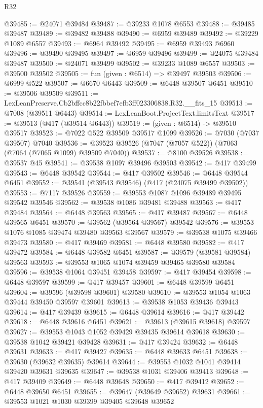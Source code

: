 \begin{lexlean}{R32}
\begin{coremodule}
@39485 := @24071 @39484
@39487 := @39233 @1078 @6553
@39488 := @39485 @39487
@39489 := @39482 @39488
@39490 := @6959 @39489
@39492 := @39229 @1089 @6557
@39493 := @6964 @39492
@39495 := @6959 @39493 @6960
@39496 := @39490 @39495
@39497 := @6959 @39496
@39499 := @24075 @39484 @39487
@39500 := @24071 @39499
@39502 := @39233 @1089 @6557
@39503 := @39500 @39502
@39505 := fun (given : @6514) => @39497 @39503
@39506 := @6999 @522
@39507 := @6670 @6443
@39509 := @6448 @39507 @6451
@39510 := @39506 @39509
@39511 := LexLeanPreserve.Cb2bffcc8b22fbbef7efb3ff023306838.R32.__fits_15
@39513 := @7008 (@39511 @6443)
@39514 := LexLeanBoot.ProjectText.limitsText
@39517 := @39513 (@417 (@39514 @6443))
@39519 := (given : @6514) -> @39510 @39517
@39523 := @7022 @522 @39509 @39517 @1099
@39526 := @7030 (@7037 @39507) @7040
@39536 := @39523 @39526 (@7047 (@7057 @522)) (@7063 (@7064 (@7065 @1099) @39509 @7040))
@39537 := @8100 @39526
@39538 := @39537 @45
@39541 := @39538 @1097 @39496 @39503
@39542 := @417 @39499
@39543 := @6448 @39542
@39544 := @417 @39502
@39546 := @6448 @39544 @6451
@39552 := @39541 (@39543 @39546) (@417 (@24075 @39499 @39502))
@39553 := @7117 @39526
@39559 := @39553 @1087 @1096 @39489 @39495 @39542 @39546
@39562 := @39538 @1086 @39481 @39488
@39563 := @417 @39484
@39564 := @6448 @39563
@39565 := @417 @39487
@39567 := @6448 @39565 @6451
@39570 := @39562 (@39564 @39567) @39542
@39576 := @39553 @1076 @1085 @39474 @39480 @39563 @39567
@39579 := @39538 @1075 @39466 @39473
@39580 := @417 @39469
@39581 := @6448 @39580
@39582 := @417 @39472
@39584 := @6448 @39582 @6451
@39587 := @39579 (@39581 @39584) @39563
@39593 := @39553 @1065 @1074 @39459 @39465 @39580 @39584
@39596 := @39538 @1064 @39451 @39458
@39597 := @417 @39454
@39598 := @6448 @39597
@39599 := @417 @39457
@39601 := @6448 @39599 @6451
@39604 := @39596 (@39598 @39601) @39580
@39610 := @39553 @1054 @1063 @39444 @39450 @39597 @39601
@39613 := @39538 @1053 @39436 @39443
@39614 := @417 @39439
@39615 := @6448 @39614
@39616 := @417 @39442
@39618 := @6448 @39616 @6451
@39621 := @39613 (@39615 @39618) @39597
@39627 := @39553 @1043 @1052 @39429 @39435 @39614 @39618
@39630 := @39538 @1042 @39421 @39428
@39631 := @417 @39424
@39632 := @6448 @39631
@39633 := @417 @39427
@39635 := @6448 @39633 @6451
@39638 := @39630 (@39632 @39635) @39614
@39644 := @39553 @1032 @1041 @39414 @39420 @39631 @39635
@39647 := @39538 @1031 @39406 @39413
@39648 := @417 @39409
@39649 := @6448 @39648
@39650 := @417 @39412
@39652 := @6448 @39650 @6451
@39655 := @39647 (@39649 @39652) @39631
@39661 := @39553 @1021 @1030 @39399 @39405 @39648 @39652

\end{coremodule}
\end{lexlean}
